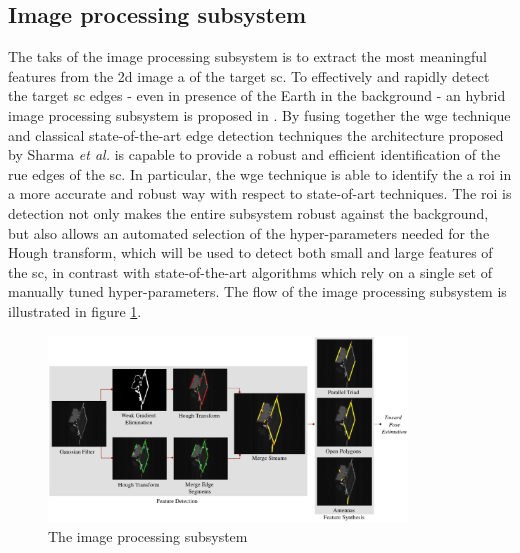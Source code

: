 \subsection{Image processing subsystem}
The taks of the image processing subsystem is to extract the most meaningful features from the \acrshort{2d} image a of the target \acrshort{sc}. To effectively and rapidly detect the target \acrshort{sc} edges - even in presence of the Earth in the background - an hybrid image processing subsystem is proposed in \cite{Sharma2018}.
By fusing together the \acrshort{wge} technique and classical state-of-the-art edge detection techniques the architecture proposed by Sharma \textit{et al.} is capable to provide a robust and efficient identification of the rue edges of the \acrshort{sc}.
In particular, the \acrshort{wge} technique is able to identify the a \acrfull{roi} in a more accurate and robust way with respect to state-of-art techniques. The \acrshort{roi} is detection not only makes the entire subsystem robust against the background, but also allows an automated selection of the hyper-parameters needed for the Hough transform, which will be used to detect both small and large features of the \acrshort{sc}, in contrast with state-of-the-art algorithms which rely on a single set of manually tuned hyper-parameters.
The flow of the image processing subsystem is illustrated in figure \ref{fig:imageProcessingSubsystem}.

\begin{figure}[htbp]
  \centering
  \includegraphics[width=0.85\textwidth]{gfx/imageProcessingSubsystem.eps}
  \caption{The image processing subsystem \cite{Sharma2018}}
  \label{fig:imageProcessingSubsystem}
\end{figure}


